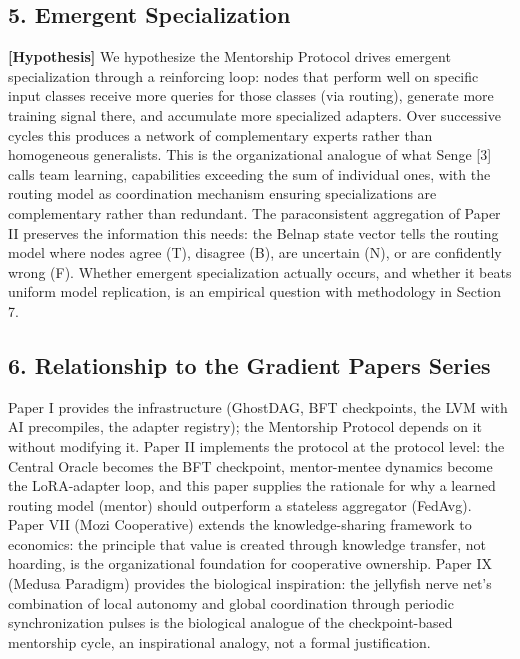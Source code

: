 \subsection{5. Emergent Specialization}\label{emergent-specialization}

\textbf{{[}Hypothesis{]}} We hypothesize the Mentorship Protocol drives
emergent specialization through a reinforcing loop: nodes that perform
well on specific input classes receive more queries for those classes
(via routing), generate more training signal there, and accumulate more
specialized adapters. Over successive cycles this produces a network of
complementary experts rather than homogeneous generalists. This is the
organizational analogue of what Senge {[}3{]} calls team learning,
capabilities exceeding the sum of individual ones, with the routing
model as coordination mechanism ensuring specializations are
complementary rather than redundant. The paraconsistent aggregation of
Paper II preserves the information this needs: the Belnap state vector
tells the routing model where nodes agree (T), disagree (B), are
uncertain (N), or are confidently wrong (F). Whether emergent
specialization actually occurs, and whether it beats uniform model
replication, is an empirical question with methodology in Section 7.

\subsection{6. Relationship to the Gradient Papers
Series}\label{relationship-to-the-gradient-papers-series}

Paper I provides the infrastructure (GhostDAG, BFT checkpoints, the LVM
with AI precompiles, the adapter registry); the Mentorship Protocol
depends on it without modifying it. Paper II implements the protocol at
the protocol level: the Central Oracle becomes the BFT checkpoint,
mentor-mentee dynamics become the LoRA-adapter loop, and this paper
supplies the rationale for why a learned routing model (mentor) should
outperform a stateless aggregator (FedAvg). Paper VII (Mozi Cooperative)
extends the knowledge-sharing framework to economics: the principle that
value is created through knowledge transfer, not hoarding, is the
organizational foundation for cooperative ownership. Paper IX (Medusa
Paradigm) provides the biological inspiration: the jellyfish nerve net's
combination of local autonomy and global coordination through periodic
synchronization pulses is the biological analogue of the
checkpoint-based mentorship cycle, an inspirational analogy, not a
formal justification.

